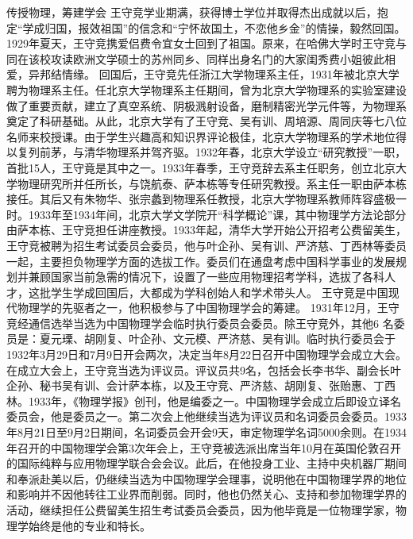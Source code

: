 传授物理，筹建学会
王守竞学业期满，获得博士学位并取得杰出成就以后，抱定“学成归国，报效祖国”的信念和“宁怀故国土，不恋他乡金”的情操，毅然回国。
1929年夏天，王守竞携爱侣费令宜女士回到了祖国。原来，在哈佛大学时王守竞与同在该校攻读欧洲文学硕士的苏州同乡、同样出身名门的大家闺秀费小姐彼此相爱，异邦结情缘。
回国后，王守竞先任浙江大学物理系主任，1931年被北京大学聘为物理系主任。任北京大学物理系主任期间，曾为北京大学物理系的实验室建设做了重要贡献，建立了真空系统、阴极溅射设备，磨制精密光学元件等，为物理系奠定了科研基础。从此，北京大学有了王守竞、吴有训、周培源、周同庆等七八位名师来校授课。由于学生兴趣高和知识界评论极佳，北京大学物理系的学术地位得以复列前茅，与清华物理系并驾齐驱。1932年春，北京大学设立“研究教授”一职，首批15人，王守竟是其中之一。1933年春季，王守竞辞去系主任职务，创立北京大学物理研究所并任所长，与饶航泰、萨本栋等专任研究教授。系主任一职由萨本栋接任。其后又有朱物华、张宗蠡到物理系任教授，北京大学物理系教师阵容盛极一时。1933年至1934年间，北京大学文学院开“科学概论”课，其中物理学方法论部分由萨本栋、王守竞担任讲座教授。1933年起，清华大学开始公开招考公费留美生，王守竞被聘为招生考试委员会委员，他与叶企孙、吴有训、严济慈、丁西林等委员一起，主要担负物理学方面的选拔工作。委员们在通盘考虑中国科学事业的发展规划并兼顾国家当前急需的情况下，设置了一些应用物理招考学科，选拔了各科人才，这批学生学成回国后，大都成为学科创始人和学术带头人。
王守竞是中国现代物理学的先驱者之一，他积极参与了中国物理学会的筹建。
1931年12月，王守竞经通信选举当选为中国物理学会临时执行委员会委员。除王守竞外，其他6 名委员是：夏元瑮、胡刚复、叶企孙、文元模、严济慈、吴有训。临时执行委员会于1932年3月29日和7月9日开会两次，决定当年8月22日召开中国物理学会成立大会。在成立大会上，王守竞当选为评议员。评议员共9名，包括会长李书华、副会长叶企孙、秘书吴有训、会计萨本栋，以及王守竞、严济慈、胡刚复、张贻惠、丁西林。1933年，《物理学报》创刊，他是编委之一。中国物理学会成立后即设立译名委员会，他是委员之一。第二次会上他继续当选为评议员和名词委员会委员。1933年8月21日至9月2日期间，名词委员会开会9天，审定物理学名词5000余则。在1934年召开的中国物理学会第3次年会上，王守竞被选派出席当年10月在英国伦敦召开的国际纯粹与应用物理学联合会会议。此后，在他投身工业、主持中央机器厂期间和奉派赴美以后，仍继续当选为中国物理学会理事，说明他在中国物理学界的地位和影响并不因他转往工业界而削弱。同时，他也仍然关心、支持和参加物理学界的活动，继续担任公费留美生招生考试委员会委员，因为他毕竟是一位物理学家，物理学始终是他的专业和特长。

